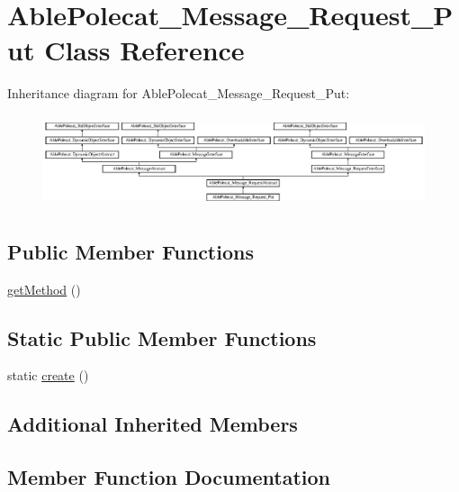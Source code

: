 \hypertarget{class_able_polecat___message___request___put}{}\section{Able\+Polecat\+\_\+\+Message\+\_\+\+Request\+\_\+\+Put Class Reference}
\label{class_able_polecat___message___request___put}
Inheritance diagram for Able\+Polecat\+\_\+\+Message\+\_\+\+Request\+\_\+\+Put\+:\begin{figure}[H]
\begin{center}
\leavevmode
\includegraphics[height=2.720648cm]{class_able_polecat___message___request___put}
\end{center}
\end{figure}
\subsection*{Public Member Functions}
\begin{DoxyCompactItemize}
\item 
\hyperlink{class_able_polecat___message___request___put_af3e37e1a6ed9b8c87f86f659873a83b7}{get\+Method} ()
\end{DoxyCompactItemize}
\subsection*{Static Public Member Functions}
\begin{DoxyCompactItemize}
\item 
static \hyperlink{class_able_polecat___message___request___put_a239b1c70258014a86569483c2d009de6}{create} ()
\end{DoxyCompactItemize}
\subsection*{Additional Inherited Members}


\subsection{Member Function Documentation}
\hypertarget{class_able_polecat___message___request___put_a239b1c70258014a86569483c2d009de6}{}
